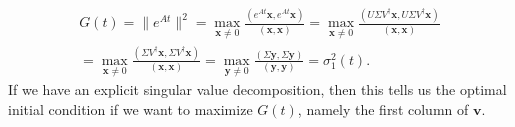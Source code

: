 \documentclass[a4paper]{article}
\begin{document}
%
%
\begin{multline*}
  G(t) =\|e^{At}\|^2 = \max_{\mathbf{x} \not= 0} \frac{(e^{At}\mathbf{x}, e^{At}\mathbf{x})}{(\mathbf{x}, \mathbf{x})} = \max_{\mathbf{x} \not= 0} \frac{(U\Sigma V^\dagger \mathbf{x}, U\Sigma V^\dagger \mathbf{x})}{(\mathbf{x}, \mathbf{x})}\\
  = \max_{\mathbf{x} \not= 0} \frac{(\Sigma V^\dagger \mathbf{x}, \Sigma V^\dagger \mathbf{x})}{(\mathbf{x}, \mathbf{x})} = \max_{\mathbf{y} \not= 0} \frac{(\Sigma \mathbf{y}, \Sigma \mathbf{y})}{(\mathbf{y}, \mathbf{y})} = \sigma_1^2(t).
\end{multline*}
If we have an explicit singular value decomposition, then this tells us the optimal initial condition if we want to maximize $G(t)$, namely the first column of $\mathbf{v}$.

\end{document}
